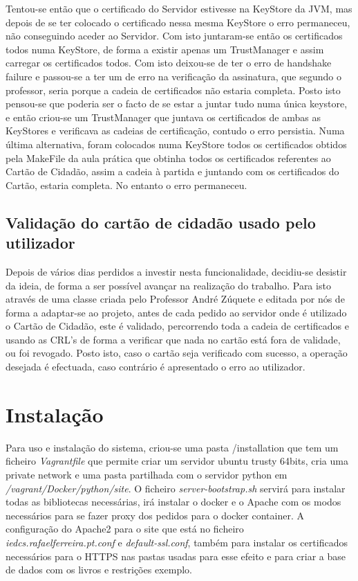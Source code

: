 \documentclass[pdftex,12pt,a4paper]{report}
\begin{document}
Tentou-se então que o certificado do Servidor estivesse na KeyStore da JVM, mas depois de se ter colocado o certificado nessa mesma KeyStore o erro permaneceu, não conseguindo aceder ao Servidor.
Com isto juntaram-se então os certificados todos numa KeyStore, de forma a existir apenas um TrustManager e assim carregar os certificados todos. Com isto deixou-se de ter o erro de handshake failure e passou-se a ter um de erro na verificação da assinatura, que segundo o professor, seria porque a cadeia de certificados não estaria completa.
Posto isto pensou-se que poderia ser o facto de se estar a juntar tudo numa única keystore, e então criou-se um TrustManager que juntava os certificados de ambas as KeyStores e verificava as cadeias de certificação, contudo o erro persistia.
Numa última alternativa, foram colocados numa KeyStore todos os certificados obtidos pela MakeFile da aula prática que obtinha todos os certificados referentes ao Cartão de Cidadão, assim a cadeia à partida e juntando com os certificados do Cartão, estaria completa. No entanto o erro permaneceu.

\subsection{Validação do cartão de cidadão usado pelo utilizador}
Depois de vários dias perdidos a investir nesta funcionalidade, decidiu-se desistir da ideia, de forma a ser possível avançar na realização do trabalho. Para isto através de uma classe criada pelo Professor André Zúquete e editada por nós de forma a adaptar-se ao projeto, antes de cada pedido ao servidor onde é utilizado o Cartão de Cidadão, este é validado, percorrendo toda a cadeia de certificados e usando as CRL’s de forma a verificar que nada no cartão está fora de validade, ou foi revogado.
Posto isto, caso o cartão seja verificado com sucesso, a operação desejada é efectuada, caso contrário é apresentado o erro ao utilizador.


\section{Instalação}

Para uso e instalação do sistema, criou-se uma pasta /installation que tem um ficheiro \textit{Vagrantfile} que permite criar um servidor ubuntu trusty 64bits, cria uma private network e uma pasta partilhada com o servidor python em \textit{/vagrant/Docker/python/site}. O ficheiro \textit{server-bootstrap.sh} servirá para instalar todas as bibliotecas necessárias, irá instalar o docker e o Apache com os modos necessários para se fazer proxy dos pedidos para o docker container.
A configuração do Apache2 para o site que está no ficheiro \textit{iedcs.rafaelferreira.pt.conf} e \textit{default-ssl.conf}, também para instalar os certificados necessários para o HTTPS nas pastas usadas para esse efeito e para criar a base de dados com os livros e restrições exemplo.
	
\end{document}
